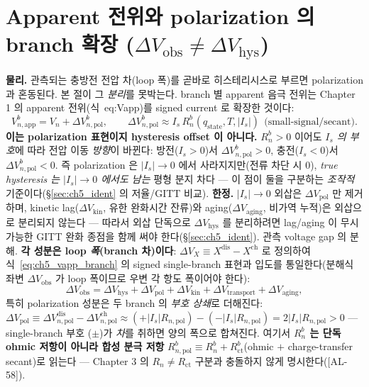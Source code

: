 \documentclass[11pt,a4paper]{article}
\newcommand{\app}{\mathrm{app}}
\newcommand{\ct}{\mathrm{ct}}
\newcommand{\transp}{\mathrm{transport}}
\newcommand{\dis}{\mathrm{dis}}
\newcommand{\chg}{\mathrm{ch}}
\newcommand{\hys}{\mathrm{hys}}
\newcommand{\pol}{\mathrm{pol}}
\newcommand{\kin}{\mathrm{kin}}
\newcommand{\obs}{\mathrm{obs}}
\newcommand{\stt}{\mathrm{state}}
\newcommand{\AL}[1]{\textsf{[AL-#1]}}
\begin{document}
\section{Apparent 전위와 polarization 의 branch 확장 ($\Delta V_\obs\ne\Delta V_\hys$)}\label{sec:ch5_apparent}
\textbf{물리.} 관측되는 충방전 전압 차(loop 폭)를 곧바로 히스테리시스로 부르면 polarization 과 혼동된다. 본
절이 그 \emph{분리}를 못박는다. branch 별 apparent 음극 전위는 Chapter 1 의 apparent 전위(식~eq:Vapp)를 signed
current 로 확장한 것이다:
\begin{equation}
V_{n,\app}^b=V_n+\Delta V_{n,\pol}^b,\qquad
\Delta V_{n,\pol}^b\approx I_s\,R_n^b(q_\stt,T,|I_s|)\ \ \text{(small-signal/secant)}.
\label{eq:ch5_vapp_branch}
\end{equation}
\textbf{이는 polarization 표현이지 hysteresis offset 이 아니다.} $R_n^b>0$ 이어도 \emph{$I_s$ 의 부호}에 따라
전압 이동 \emph{방향}이 바뀐다: 방전($I_s>0$)서 $\Delta V_{n,\pol}^b>0$, 충전($I_s<0$)서 $\Delta V_{n,\pol}^b<0$.
즉 polarization 은 $|I_s|\to0$ 에서 사라지지만(전류 차단 시 0), \emph{true hysteresis 는 $|I_s|\to0$ 에서도
남는} 평형 분지 차다 — 이 점이 둘을 구분하는 \emph{조작적} 기준이다(\S\ref{sec:ch5_ident} 의 저율/GITT 비교).
\textbf{한정.} $|I_s|\to0$ 외삽은 $\Delta V_\pol$ 만 제거하며, kinetic lag($\Delta V_\kin$, 유한 완화시간 잔류)와
aging($\Delta V_{\mathrm{aging}}$, 비가역 누적)은 외삽으로 분리되지 않는다 — 따라서 외삽 단독으로 $\Delta V_\hys$
를 분리하려면 lag/aging 이 무시 가능한 GITT 완화 종점을 함께 써야 한다(\S\ref{sec:ch5_ident}).
관측 voltage gap 의 분해. \textbf{각 성분은 loop \emph{폭}(branch 차)이다}: $\Delta V_X\equiv X^\dis-X^\chg$ 로
정의하여 식~\eqref{eq:ch5_vapp_branch} 의 signed single-branch 표현과 입도를 통일한다(분해식 좌변 $\Delta V_\obs$
가 loop 폭이므로 우변 각 항도 폭이어야 한다):
\begin{equation}
\Delta V_\obs=\Delta V_\hys+\Delta V_\pol+\Delta V_\kin+\Delta V_\transp+\Delta V_{\mathrm{aging}},
\label{eq:ch5_gap_decomp}
\end{equation}
특히 polarization 성분은 두 branch 의 \emph{부호 상쇄}로 더해진다: $\Delta V_\pol\equiv\Delta V_{n,\pol}^\dis
-\Delta V_{n,\pol}^\chg\approx(+|I_s|R_{n,\pol})-(-|I_s|R_{n,\pol})=2|I_s|R_{n,\pol}>0$ — single-branch 부호
($\pm$)가 \emph{차}를 취하면 양의 폭으로 합쳐진다. 여기서 \textbf{$R_n^b$ 는 단독 ohmic 저항이 아니라 합성 분극
저항} $R_{n,\pol}^b\equiv R_n^b+R_\ct^b$(ohmic $+$ charge-transfer secant)로 읽는다 — Chapter 3 의 $R_n\ne R_\ct$
구분과 충돌하지 않게 명시한다(\AL{58}).
\end{document}
